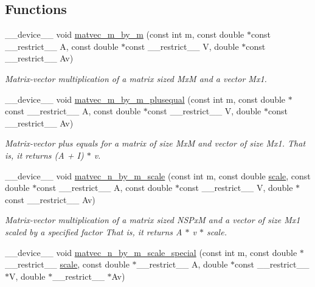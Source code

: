 \subsection*{Functions}
\begin{DoxyCompactItemize}
\item 
\+\_\+\+\_\+device\+\_\+\+\_\+ void \hyperlink{exponential__linear__algebra_8cu_a2e59348b99908b5918de88097e15d5ff}{matvec\+\_\+m\+\_\+by\+\_\+m} (const int m, const double $\ast$const \+\_\+\+\_\+restrict\+\_\+\+\_\+ A, const double $\ast$const \+\_\+\+\_\+restrict\+\_\+\+\_\+ V, double $\ast$const \+\_\+\+\_\+restrict\+\_\+\+\_\+ Av)
\begin{DoxyCompactList}\small\item\em Matrix-\/vector multiplication of a matrix sized MxM and a vector Mx1. \end{DoxyCompactList}\item 
\+\_\+\+\_\+device\+\_\+\+\_\+ void \hyperlink{exponential__linear__algebra_8cu_a6bc7e5c08b8e40b19ce05ea146c05307}{matvec\+\_\+m\+\_\+by\+\_\+m\+\_\+plusequal} (const int m, const double $\ast$const \+\_\+\+\_\+restrict\+\_\+\+\_\+ A, const double $\ast$const \+\_\+\+\_\+restrict\+\_\+\+\_\+ V, double $\ast$const \+\_\+\+\_\+restrict\+\_\+\+\_\+ Av)
\begin{DoxyCompactList}\small\item\em Matrix-\/vector plus equals for a matrix of size MxM and vector of size Mx1. That is, it returns (A + I) $\ast$ v. \end{DoxyCompactList}\item 
\+\_\+\+\_\+device\+\_\+\+\_\+ void \hyperlink{exponential__linear__algebra_8cu_a03e37312683db492dc73e08c17fe40e7}{matvec\+\_\+n\+\_\+by\+\_\+m\+\_\+scale} (const int m, const double \hyperlink{radau2a_8cu_a4fab5866449108992478041d2e51a28c}{scale}, const double $\ast$const \+\_\+\+\_\+restrict\+\_\+\+\_\+ A, const double $\ast$const \+\_\+\+\_\+restrict\+\_\+\+\_\+ V, double $\ast$const \+\_\+\+\_\+restrict\+\_\+\+\_\+ Av)
\begin{DoxyCompactList}\small\item\em Matrix-\/vector multiplication of a matrix sized N\+S\+PxM and a vector of size Mx1 scaled by a specified factor That is, it returns A $\ast$ v $\ast$ scale. \end{DoxyCompactList}\item 
\+\_\+\+\_\+device\+\_\+\+\_\+ void \hyperlink{exponential__linear__algebra_8cu_aafe924c72a847b1d591e8fecb0efebdc}{matvec\+\_\+n\+\_\+by\+\_\+m\+\_\+scale\+\_\+special} (const int m, const double $\ast$\+\_\+\+\_\+restrict\+\_\+\+\_\+ \hyperlink{radau2a_8cu_a4fab5866449108992478041d2e51a28c}{scale}, const double $\ast$\+\_\+\+\_\+restrict\+\_\+\+\_\+ A, double $\ast$const \+\_\+\+\_\+restrict\+\_\+\+\_\+ $\ast$V, double $\ast$\+\_\+\+\_\+restrict\+\_\+\+\_\+ $\ast$Av)

\end{DoxyCompactItemize}
